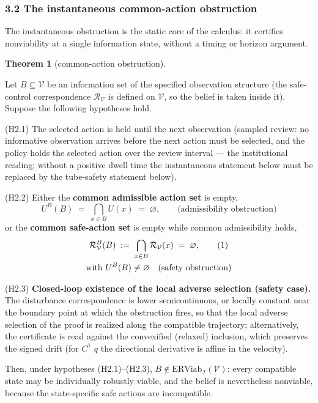 \documentclass[10pt,twocolumn]{article}
\theoremstyle{definition}
\newtheorem{theorem}{Theorem}
\begin{document}
\subsubsection{3.2 The instantaneous common-action
obstruction}\label{calc-the-instantaneous-common-action-obstruction}

The instantaneous obstruction is the static core of the calculus: it certifies nonviability at a single information state, without a timing or horizon argument.

\begin{theorem}[common-action obstruction]\label{calc-thm:common-action}

Let \(B \subseteq \mathcal{V}\) be an information set of the specified observation structure (the safe-control correspondence
\(\mathcal{R}_{\mathcal{V}}\) is defined on \(\mathcal{V}\), so the
belief is taken inside it). Suppose the following hypotheses hold.

(H2.1) The selected action is held until the next observation (sampled
review: no informative observation arrives before the next action must
be selected, and the policy holds the selected action over the review
interval --- the institutional reading; without a positive dwell time
the instantaneous statement below must be replaced by the tube-safety statement below).

(H2.2) Either the \textbf{common admissible action set} is empty,
\[U^B(B) \;=\; \bigcap_{x \in B} U(x) \;=\; \varnothing, \qquad \text{(admissibility obstruction)}\]
or the \textbf{common safe-action set} is empty while common
admissibility holds,
\begin{gather}
\mathcal{R}_{\mathcal{V}}^B(B) \;:=\; \bigcap_{x \in B} \mathcal{R}_{\mathcal{V}}(x) \;=\; \varnothing, \tag{1}\\
\text{with } U^B(B) \neq \varnothing \quad \text{(safety obstruction)} \notag
\end{gather}

(H2.3) \textbf{Closed-loop existence of the local adverse selection
(safety case).} The disturbance correspondence is lower semicontinuous,
or locally constant near the boundary point at which the obstruction
fires, so that the local adverse selection of the proof is realized
along the compatible trajectory; alternatively, the certificate is read
against the convexified (relaxed) inclusion, which preserves the
signed drift (for \(C^1\) \(q\) the directional derivative is affine in the velocity).

Then, under hypotheses (H2.1)--(H2.3),
\(B \notin \mathrm{ERViab}_{\mathcal{I}}(\mathcal{V})\): every
compatible state may be individually robustly viable, and the belief is
nevertheless nonviable, because the state-specific safe actions are
incompatible.

\end{theorem}
\end{document}

